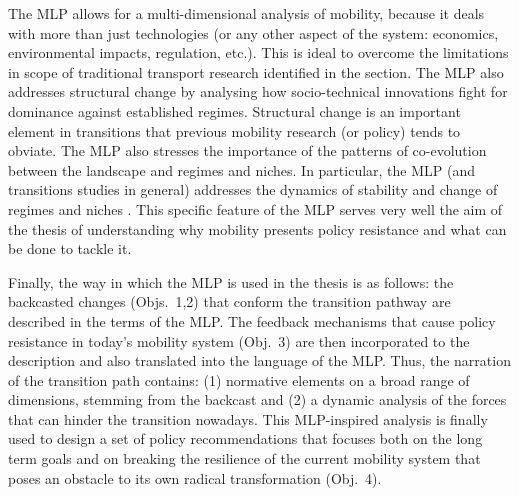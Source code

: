 
The MLP allows for a multi-dimensional analysis of mobility, because it deals with more than just technologies (or any other aspect of the system: economics, environmental impacts, regulation, etc.). This is ideal to overcome the limitations in scope of traditional transport research identified in the  section. The MLP also addresses structural change by analysing how socio-technical innovations fight for dominance against established regimes. Structural change is an important element in transitions that previous mobility research (or policy) tends to obviate. The MLP also stresses the importance of the patterns of co-evolution between the landscape and regimes and niches. In particular, the MLP (and transitions studies in general) addresses the dynamics of stability and change of regimes and niches \parencite{geels2011_multilevelperspective}. This specific feature of the MLP serves very well the aim of the thesis of understanding why mobility presents policy resistance and what can be done to tackle it.

Finally, the way in which the MLP is used in the thesis is as follows: the backcasted changes (Objs.~1,2) that conform the transition pathway are described in the terms of the MLP. The feedback mechanisms that cause policy resistance in today's mobility system (Obj.~3) are then incorporated to the description and also translated into the language of the MLP. Thus, the narration of the transition path contains: (1) normative elements on a broad range of dimensions, stemming from the backcast and (2) a dynamic analysis of the forces that can hinder the transition nowadays. This MLP-inspired analysis is finally used to design a set of policy recommendations that focuses both on the long term goals and on breaking the resilience of the current mobility system that poses an obstacle to its own radical transformation (Obj.~4).